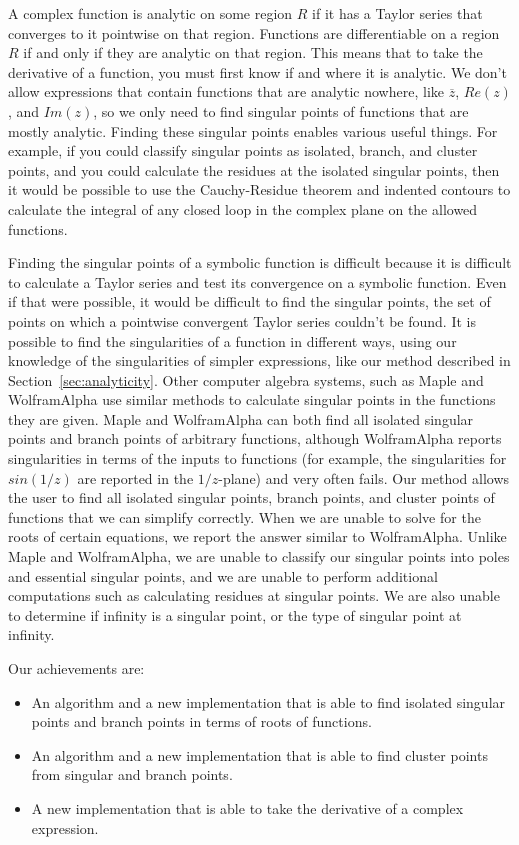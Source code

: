 A complex function is analytic on some region $R$ if it has a Taylor series that converges to it pointwise on that region. Functions are differentiable on a region $R$ if and only if they are analytic on that region. This means that to take the derivative of a function, you must first know if and where it is analytic. We don't allow expressions that contain functions that are analytic nowhere, like $\overline z$, $Re(z)$, and $Im(z)$, so we only need to find singular points of functions that are mostly analytic. Finding these singular points enables various useful things. For example, if you could classify singular points as isolated, branch, and cluster points, and you could calculate the residues at the isolated singular points, then it would be possible to use the Cauchy-Residue theorem and indented contours to calculate the integral of any closed loop in the complex plane on the allowed functions.

Finding the singular points of a symbolic function is difficult because it is difficult to calculate a Taylor series and test its convergence on a symbolic function. Even if that were possible, it would be difficult to find the singular points, the set of points on which a pointwise convergent Taylor series couldn't be found. It is possible to find the singularities of a function in different ways, using our knowledge of the singularities of simpler expressions, like our method described in Section~\ref{sec:analyticity}. Other computer algebra systems, such as Maple and WolframAlpha use similar methods to calculate singular points in the functions they are given. Maple and WolframAlpha can both find all isolated singular points and branch points of arbitrary functions, although WolframAlpha reports singularities in terms of the inputs to functions (for example, the singularities for $sin(1/z)$ are reported in the $1/z$-plane) and very often fails. Our method allows the user to find all isolated singular points, branch points, and cluster points of functions that we can simplify correctly. When we are unable to solve for the roots of certain equations, we report the answer similar to WolframAlpha. Unlike Maple and WolframAlpha, we are unable to classify our singular points into poles and essential singular points, and we are unable to perform additional computations such as calculating residues at singular points. We are also unable to determine if infinity is a singular point, or the type of singular point at infinity.

Our achievements are:
\begin{itemize}
	\item An algorithm and a new implementation that is able to find isolated singular points and branch points in terms of roots of functions.
	\item An algorithm and a new implementation that is able to find cluster points from singular and branch points.
	\item A new implementation that is able to take the derivative of a complex expression.
\end{itemize}
